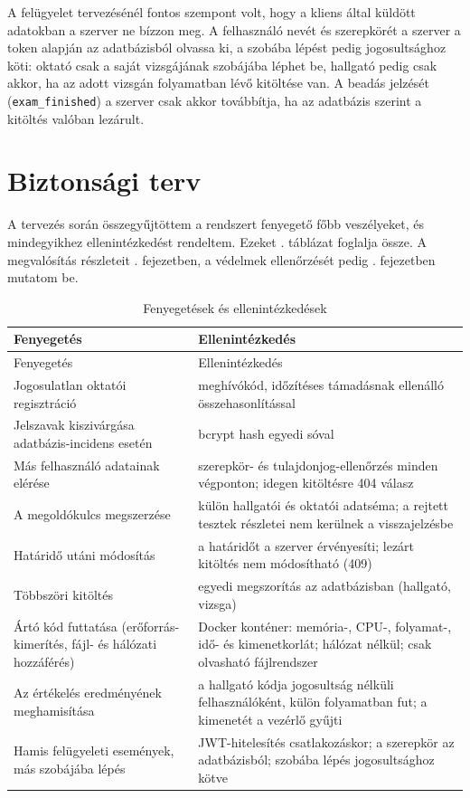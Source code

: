 A felügyelet tervezésénél fontos szempont volt, hogy a kliens által küldött adatokban a szerver ne
bízzon meg. A felhasználó nevét és szerepkörét a szerver a token alapján az adatbázisból olvassa
ki, a szobába lépést pedig jogosultsághoz köti: oktató csak a saját vizsgájának szobájába
léphet be, hallgató pedig csak akkor, ha az adott vizsgán folyamatban lévő kitöltése van. A
beadás jelzését (\texttt{exam\_finished}) a szerver csak akkor továbbítja, ha az adatbázis szerint
a kitöltés valóban lezárult.

\section{Biztonsági terv}
\label{sec:biztonsagi_terv}

A tervezés során összegyűjtöttem a rendszert fenyegető főbb veszélyeket, és mindegyikhez
ellenintézkedést rendeltem. Ezeket . táblázat foglalja össze. A
megvalósítás részleteit . fejezetben, a védelmek ellenőrzését pedig
. fejezetben mutatom be.

\begin{longtable}{@{}>{\raggedright\arraybackslash}p{5.2cm}>{\raggedright\arraybackslash}p{8.8cm}@{}}
  \caption{Fenyegetések és ellenintézkedések}\label{tab:fenyegetesek}\\
  \toprule
  Fenyegetés & Ellenintézkedés \\
  \midrule
  \endfirsthead
  \toprule
  Fenyegetés & Ellenintézkedés \\
  \midrule
  \endhead
  Jogosulatlan oktatói regisztráció & meghívókód, időzítéses támadásnak ellenálló összehasonlítással \\
  Jelszavak kiszivárgása adatbázis-incidens esetén & bcrypt hash egyedi sóval \\
  Más felhasználó adatainak elérése & szerepkör- és tulajdonjog-ellenőrzés minden végponton; idegen kitöltésre 404 válasz \\
  A megoldókulcs megszerzése & külön hallgatói és oktatói adatséma; a rejtett tesztek részletei nem kerülnek a visszajelzésbe \\
  Határidő utáni módosítás & a határidőt a szerver érvényesíti; lezárt kitöltés nem módosítható (409) \\
  Többszöri kitöltés & egyedi megszorítás az adatbázisban (hallgató, vizsga) \\
  Ártó kód futtatása (erőforrás-kimerítés, fájl- és hálózati hozzáférés) & Docker konténer: memória-, CPU-, folyamat-, idő- és kimenetkorlát; hálózat nélkül; csak olvasható fájlrendszer \\
  Az értékelés eredményének meghamisítása & a hallgató kódja jogosultság nélküli felhasználóként, külön folyamatban fut; a kimenetét a vezérlő gyűjti \\
  Hamis felügyeleti események, más szobájába lépés & JWT-hitelesítés csatlakozáskor; a szerepkör az adatbázisból; szobába lépés jogosultsághoz kötve \\
  \bottomrule
\end{longtable}
